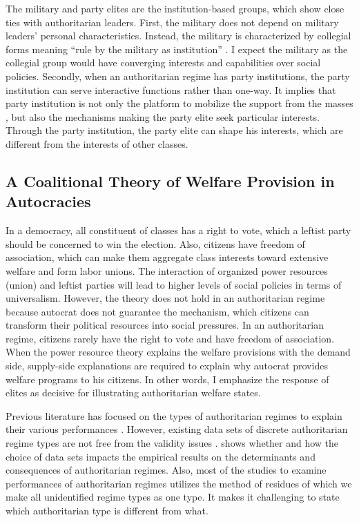 \documentclass[11pt, notitlepage]{article}
\begin{document}
The military and party elites are the institution-based groups, which show close ties with authoritarian leaders. First, the military does not depend on military leaders’ personal characteristics. Instead, the military is characterized by collegial forms meaning ``rule by the military as institution'' \citep{Geddes2014b, Kim2017}. I expect the military as the collegial group would have converging interests and capabilities over social policies. Secondly, when an authoritarian regime has party institutions, the party institution can serve interactive functions rather than one-way. It implies that party institution is not only the platform to mobilize the support from the masses \citep{Gandhi2006}, but also the mechanisms making the party elite seek particular interests. Through the party institution, the party elite can shape his interests, which are different from the interests of other classes.


\subsection{A Coalitional Theory of Welfare Provision in Autocracies}

In a democracy, all constituent of classes has a right to vote, which a leftist party should be concerned to win the election. Also, citizens have freedom of association, which can make them aggregate class interests toward extensive welfare and form labor unions. The interaction of organized power resources (union) and leftist parties will lead to higher levels of social policies in terms of universalism. However, the theory does not hold in an authoritarian regime because autocrat does not guarantee the mechanism, which citizens can transform their political resources into social pressures. In an authoritarian regime, citizens rarely have the right to vote and have freedom of association. When the power resource theory explains the welfare provisions with the demand side, supply-side explanations are required to explain why autocrat provides welfare programs to his citizens. In other words, I emphasize the response of elites as decisive for illustrating authoritarian welfare states.

Previous literature has focused on the types of authoritarian regimes to explain their various performances \citep{Charron2011a,Roller2013,Cassani2017a,Yan2019}. However, existing data sets of discrete authoritarian regime types are not free from the validity issues \citep{Wilson2014}. \citet[52]{Roller2013} shows whether and how the choice of data sets impacts the empirical results on the determinants and consequences of authoritarian regimes. Also, most of the studies to examine performances of authoritarian regimes utilizes the method of residues of which we make all unidentified regime types as one type. It makes it challenging to state which authoritarian type is different from what.
\end{document}
